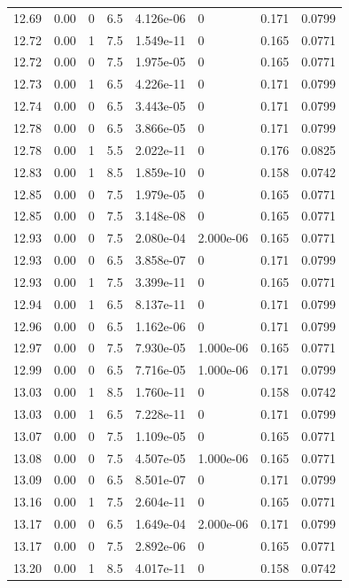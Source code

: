 \documentclass[preview]{standalone}
\begin{document}
{{{{{{{{{{{{{{{\begin{tabular}{L{1.2cm}C{1.2cm} C{0.3cm}C{0.5cm} C{1.4cm}C{1.4cm} C{1.4cm}C{1.4cm}}
  12.69  &  0.00  & 0     & 6.5 &  4.126e-06  & 0  & 0.171 &  0.0799   \\ 
  12.72  &  0.00  & 1     & 7.5 &  1.549e-11  & 0  & 0.165 &  0.0771   \\ 
  12.72  &  0.00  & 0     & 7.5 &  1.975e-05  & 0  & 0.165 &  0.0771   \\ 
  12.73  &  0.00  & 1     & 6.5 &  4.226e-11  & 0  & 0.171 &  0.0799   \\ 
  12.74  &  0.00  & 0     & 6.5 &  3.443e-05  & 0  & 0.171 &  0.0799   \\ 
  12.78  &  0.00  & 0     & 6.5 &  3.866e-05  & 0  & 0.171 &  0.0799   \\ 
  12.78  &  0.00  & 1     & 5.5 &  2.022e-11  & 0  & 0.176 &  0.0825   \\ 
  12.83  &  0.00  & 1     & 8.5 &  1.859e-10  & 0  & 0.158 &  0.0742   \\ 
  12.85  &  0.00  & 0     & 7.5 &  1.979e-05  & 0  & 0.165 &  0.0771   \\ 
  12.85  &  0.00  & 0     & 7.5 &  3.148e-08  & 0  & 0.165 &  0.0771   \\ 
  12.93  &  0.00  & 0     & 7.5 &  2.080e-04  & 2.000e-06  & 0.165 &  0.0771   \\ 
  12.93  &  0.00  & 0     & 6.5 &  3.858e-07  & 0  & 0.171 &  0.0799   \\ 
  12.93  &  0.00  & 1     & 7.5 &  3.399e-11  & 0  & 0.165 &  0.0771   \\ 
  12.94  &  0.00  & 1     & 6.5 &  8.137e-11  & 0  & 0.171 &  0.0799   \\ 
  12.96  &  0.00  & 0     & 6.5 &  1.162e-06  & 0  & 0.171 &  0.0799   \\ 
  12.97  &  0.00  & 0     & 7.5 &  7.930e-05  & 1.000e-06  & 0.165 &  0.0771   \\ 
  12.99  &  0.00  & 0     & 6.5 &  7.716e-05  & 1.000e-06  & 0.171 &  0.0799   \\ 
  13.03  &  0.00  & 1     & 8.5 &  1.760e-11  & 0  & 0.158 &  0.0742   \\ 
  13.03  &  0.00  & 1     & 6.5 &  7.228e-11  & 0  & 0.171 &  0.0799   \\ 
  13.07  &  0.00  & 0     & 7.5 &  1.109e-05  & 0  & 0.165 &  0.0771   \\ 
  13.08  &  0.00  & 0     & 7.5 &  4.507e-05  & 1.000e-06  & 0.165 &  0.0771   \\ 
  13.09  &  0.00  & 0     & 6.5 &  8.501e-07  & 0  & 0.171 &  0.0799   \\ 
  13.16  &  0.00  & 1     & 7.5 &  2.604e-11  & 0  & 0.165 &  0.0771   \\ 
  13.17  &  0.00  & 0     & 6.5 &  1.649e-04  & 2.000e-06  & 0.171 &  0.0799   \\ 
  13.17  &  0.00  & 0     & 7.5 &  2.892e-06  & 0  & 0.165 &  0.0771   \\ 
  13.20  &  0.00  & 1     & 8.5 &  4.017e-11  & 0  & 0.158 &  0.0742   \\ 
\hline 
\end{tabular} 

}}}}}}}}}}}}}}}
\end{document}
